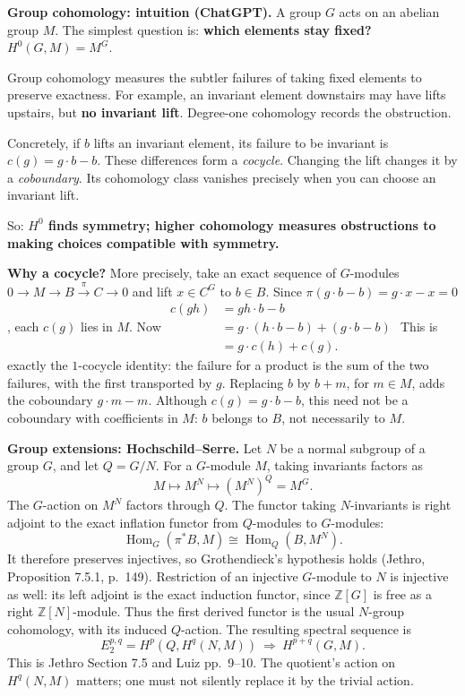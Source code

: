 \medskip\noindent
{\bf Group cohomology: intuition
(ChatGPT).}
A group $G$ acts on an abelian group $M$.
The simplest question is:
{\bf which elements stay fixed?}
$
H^0(G,M)=M^G.
$

Group cohomology measures the subtler
failures of taking fixed elements to
preserve exactness. For example, an
invariant element downstairs may have
lifts upstairs, but {\bf no invariant
lift}. Degree-one cohomology records
the obstruction.

Concretely, if $b$ lifts an invariant
element, its failure to be invariant is
$
c(g)=g\cdot b-b.
$
These differences form a \emph{cocycle}.
Changing the lift changes it by a
\emph{coboundary}. Its cohomology class
vanishes precisely when you can choose
an invariant lift.

So: {\bf $H^0$ finds symmetry; higher
cohomology measures obstructions to making
choices compatible with symmetry.}

\medskip\noindent
{\bf Why a cocycle?}
More precisely, take an exact sequence
of $G$-modules
$
0\to M\to B\xrightarrow{\pi}C\to0
$
and lift $x\in C^G$ to $b\in B$.
Since $\pi(g\cdot b-b)=g\cdot x-x=0$,
each $c(g)$ lies in $M$. Now
$
\begin{aligned}
c(gh)&=gh\cdot b-b\\
&=g\cdot(h\cdot b-b)+(g\cdot b-b)\\
&=g\cdot c(h)+c(g).
\end{aligned}
$
This is exactly the $1$-cocycle identity:
the failure for a product is the sum
of the two failures, with the first
transported by $g$.
Replacing $b$ by $b+m$, for $m\in M$,
adds the coboundary $g\cdot m-m$.
Although $c(g)=g\cdot b-b$, this need
not be a coboundary with coefficients
in $M$: $b$ belongs to $B$, not
necessarily to $M$.

\medskip\noindent
{\bf Group extensions: Hochschild--Serre.}
Let $N$ be a normal subgroup of a group
$G$, and let $Q=G/N$. For a $G$-module $M$,
taking invariants factors as
$$
M\longmapsto M^N\longmapsto(M^N)^Q=M^G.
$$
The $G$-action on $M^N$ factors through
$Q$. The functor taking $N$-invariants
is right adjoint to the exact inflation
functor from $Q$-modules to $G$-modules:
$$
\operatorname{Hom}_G(\pi^*B,M)
\cong\operatorname{Hom}_Q(B,M^N).
$$
It therefore preserves injectives, so
Grothendieck's hypothesis holds
(Jethro, Proposition 7.5.1, p.~149).
Restriction of an injective $G$-module
to $N$ is injective as well: its left
adjoint is the exact induction functor,
since $\mathbb Z[G]$ is free as a right
$\mathbb Z[N]$-module. Thus the first
derived functor is the usual $N$-group
cohomology, with its induced $Q$-action.
The resulting spectral sequence is
$$
E_2^{p,q}=H^p(Q,H^q(N,M))
\ \Longrightarrow\ H^{p+q}(G,M).
$$
This is Jethro Section 7.5 and Luiz
pp.~9--10. The quotient's action on
$H^q(N,M)$ matters; one must not silently
replace it by the trivial action.

